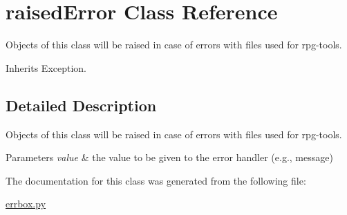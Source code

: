 \hypertarget{classrpgtoolbox_1_1errbox_1_1raisedError}{}\section{raised\+Error Class Reference}
\label{classrpgtoolbox_1_1errbox_1_1raisedError}


Objects of this class will be raised in case of errors with files used for rpg-\/tools.  




Inherits Exception.



\subsection{Detailed Description}
Objects of this class will be raised in case of errors with files used for rpg-\/tools. 


\begin{DoxyParams}{Parameters}
{\em value} & the value to be given to the error handler (e.\+g., message) \\
\hline
\end{DoxyParams}


The documentation for this class was generated from the following file\+:\begin{DoxyCompactItemize}
\item 
\hyperlink{errbox_8py}{errbox.\+py}\end{DoxyCompactItemize}
